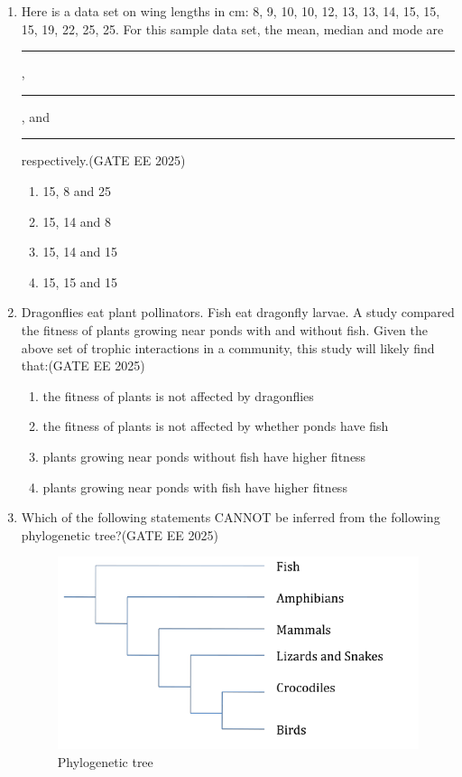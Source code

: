 \begin{enumerate}[leftmargin=*,label=\textbf{Q.\arabic*},resume]

\item Here is a data set on wing lengths in cm: 8, 9, 10, 10, 12, 13, 13, 14, 15, 15, 15, 19, 22, 25, 25. For this sample data set, the mean, median and mode are \rule{3cm}{0.15mm}, \rule{3cm}{0.15mm}, and \rule{3cm}{0.15mm} respectively.\hfill {(GATE EE 2025)}
\begin{multicols}{2}
\begin{enumerate}
\item 15, 8 and 25
\item 15, 14 and 8
\item 15, 14 and 15
\item 15, 15 and 15
\end{enumerate}
\end{multicols}

\item Dragonflies eat plant pollinators. Fish eat dragonfly larvae. A study compared the fitness of plants growing near ponds with and without fish. Given the above set of trophic interactions in a community, this study will likely find that:\hfill {(GATE EE 2025)}
\begin{multicols}{2}
\begin{enumerate}
\item the fitness of plants is not affected by dragonflies
\item the fitness of plants is not affected by whether ponds have fish
\item plants growing near ponds without fish have higher fitness
\item plants growing near ponds with fish have higher fitness
\end{enumerate}
\end{multicols}

\item Which of the following statements CANNOT be inferred from the following phylogenetic tree?\hfill {(GATE EE 2025)}

\begin{figure}[H]
    \centering
    \includegraphics[width=0.9\columnwidth]{figs/imageQ28.png}
    \caption{Phylogenetic tree}
    \label{fig:q28-phylogeny}
\end{figure}


\end{enumerate}
